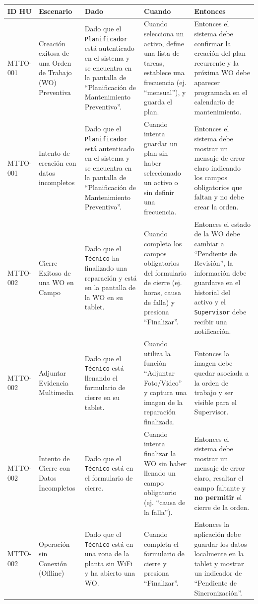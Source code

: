 \documentclass[12pt, a4paper]{article}
\begin{document}
\begin{longtable}{|p{1.8cm}|p{3cm}|p{3.5cm}|p{3.5cm}|p{3.5cm}|}
\hline
\textbf{ID HU} & \textbf{Escenario} & \textbf{Dado} & \textbf{Cuando} & \textbf{Entonces} \\ \hline
MTTO-001 & Creación exitosa de una Orden de Trabajo (WO) Preventiva & Dado que el \texttt{Planificador} está autenticado en el sistema y se encuentra en la pantalla de ``Planificación de Mantenimiento Preventivo''. & Cuando selecciona un activo, define una lista de tareas, establece una frecuencia (ej. ``mensual''), y guarda el plan. & Entonces el sistema debe confirmar la creación del plan recurrente y la próxima WO debe aparecer programada en el calendario de mantenimiento. \\ \hline
MTTO-001 & Intento de creación con datos incompletos & Dado que el \texttt{Planificador} está autenticado en el sistema y se encuentra en la pantalla de ``Planificación de Mantenimiento Preventivo''. & Cuando intenta guardar un plan sin haber seleccionado un activo o sin definir una frecuencia. & Entonces el sistema debe mostrar un mensaje de error claro indicando los campos obligatorios que faltan y no debe crear la orden. \\ \hline
MTTO-002 & Cierre Exitoso de una WO en Campo & Dado que el \texttt{Técnico} ha finalizado una reparación y está en la pantalla de la WO en su tablet. & Cuando completa los campos obligatorios del formulario de cierre (ej. horas, causa de falla) y presiona ``Finalizar''. & Entonces el estado de la WO debe cambiar a ``Pendiente de Revisión'', la información debe guardarse en el historial del activo y el \texttt{Supervisor} debe recibir una notificación. \\ \hline
MTTO-002 & Adjuntar Evidencia Multimedia & Dado que el \texttt{Técnico} está llenando el formulario de cierre en su tablet. & Cuando utiliza la función ``Adjuntar Foto/Video'' y captura una imagen de la reparación finalizada. & Entonces la imagen debe quedar asociada a la orden de trabajo y ser visible para el Supervisor. \\ \hline
MTTO-002 & Intento de Cierre con Datos Incompletos & Dado que el \texttt{Técnico} está en el formulario de cierre. & Cuando intenta finalizar la WO sin haber llenado un campo obligatorio (ej. ``causa de la falla''). & Entonces el sistema debe mostrar un mensaje de error claro, resaltar el campo faltante y \textbf{no permitir} el cierre de la orden. \\ \hline
MTTO-002 & Operación sin Conexión (Offline) & Dado que el \texttt{Técnico} está en una zona de la planta sin WiFi y ha abierto una WO. & Cuando completa el formulario de cierre y presiona ``Finalizar''. & Entonces la aplicación debe guardar los datos localmente en la tablet y mostrar un indicador de ``Pendiente de Sincronización''. \\ \hline

\end{longtable}
\end{document}

